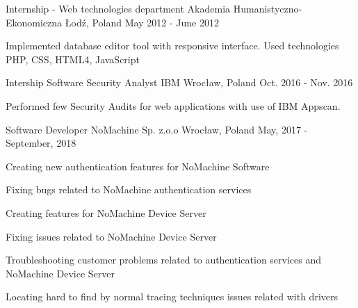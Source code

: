 

\begin{cventries}

  \cventry
    {Internship - Web technologies department} %
    {Akademia Humanistyczno-Ekonomiczna} %
    {Łodź, Poland} %
    {May 2012 - June 2012} %
    {
      \begin{cvitems} %
        \item {Implemented database editor tool with responsive interface. Used technologies PHP, CSS, HTML4, JavaScript} 
      \end{cvitems}
    }

  \cventry
    {Intership Software Security Analyst} %
    {IBM} %
    {Wrocław, Poland} %
    {Oct. 2016 - Nov. 2016} %
    {
      \begin{cvitems} %
        \item {Performed few Security Audits for web applications with use of IBM Appscan.}
      \end{cvitems}
    }

  \cventry
    {Software Developer} %
    {NoMachine Sp. z.o.o} %
    {Wrocław, Poland} %
    {May, 2017 - September, 2018} %
    {
      \begin{cvitems} %
        \item {Creating new authentication features for NoMachine Software}
        \item {Fixing bugs related to NoMachine authentication services}
        \item {Creating features for NoMachine Device Server}
        \item {Fixing issues related to NoMachine Device Server}
        \item {Troubleshooting customer problems related to authentication services and NoMachine Device Server}
        \item {Locating hard to find by normal tracing techniques issues related with drivers}
      \end{cvitems}
    }


\end{cventries}
